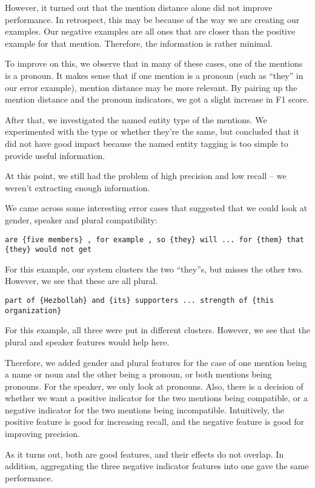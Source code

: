 \documentclass[12pt, twocolumn]{article}
\begin{document}
However, it turned out that the mention distance alone did not improve performance. In retrospect, this may be because of the way we are creating our examples. Our negative examples are all ones that are closer than the positive example for that mention. Therefore, the information is rather minimal.

To improve on this, we observe that in many of these cases, one of the mentions is a pronoun. It makes sense that if one mention is a pronoun (such as ``they'' in our error example), mention distance may be more relevant. By pairing up the mention distance and the pronoun indicators, we got a slight increase in F1 score.

After that, we investigated the named entity type of the mentions. We experimented with the type or whether they're the same, but concluded that it did not have good impact because the named entity tagging is too simple to provide useful information.

At this point, we still had the problem of high precision and low recall -- we weren't extracting enough information.

We came across some interesting error cases that suggested that we could look at gender, speaker and plural compatibility:

\texttt{are \{{five members\}} , for example , so \{{they\}} will ... for \{{them\}} that \{{they\}} would not get}

For this example, our system clusters the two ``they''s, but misses the other two. However, we see that these are all plural.

\texttt{part of {\{Hezbollah\}} and {\{its}\} supporters ... strength of \{{this organization}\}}

For this example, all three were put in different clusters. However, we see that the plural and speaker features would help here.

Therefore, we added gender and plural features for the case of one mention being a name or noun and the other being a pronoun, or both mentions being pronouns. For the speaker, we only look at pronouns. Also, there is a decision of whether we want a positive indicator for the two mentions being compatible, or a negative indicator for the two mentions being incompatible. Intuitively, the positive feature is good for increasing recall, and the negative feature is good for improving precision.

As it turns out, both are good features, and their effects do not overlap. In addition, aggregating the three negative indicator features into one gave the same performance.
\end{document}
